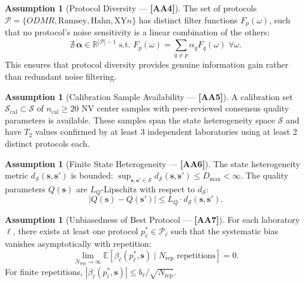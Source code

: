 \documentclass[11pt,a4paper]{article}
\theoremstyle{definition}
\newtheorem{assumption}[theorem]{Assumption}
\newcommand{\R}{\mathbb{R}}
\newcommand{\E}{\mathbb{E}}
\newcommand{\cP}{\mathcal{P}}
\newcommand{\cS}{\mathcal{S}}
\newcommand{\Ttwo}{T_2}
\newcommand{\NV}{NV}
\newcommand{\ODMR}{ODMR}
\newcommand{\assumptionTag}[1]{\textsf{\textbf{[A#1]}}}
\begin{document}
\begin{assumption}[Protocol Diversity — \assumptionTag{A4}]
\label{ass:A4}
The set of protocols $\cP = \{\ODMR, \text{Ramsey}, \text{Hahn}, \text{XY}n\}$
has distinct filter functions $F_p(\omega)$, such that no protocol's
noise sensitivity is a linear combination of the others:
\begin{equation}
    \nexists\, \boldsymbol{\alpha} \in \R^{|\cP|-1} \text{ s.t. } F_p(\omega) = \sum_{q \neq p} \alpha_q F_q(\omega) \; \forall \omega.
\end{equation}
This ensures that protocol diversity provides genuine information gain
rather than redundant noise filtering.
\end{assumption}

\begin{assumption}[Calibration Sample Availability — \assumptionTag{A5}]
\label{ass:A5}
A calibration set $\cS_{\text{cal}} \subset \cS$ of $n_{\text{cal}} \geq 20$
\NV{} center samples with peer-reviewed consensus quality parameters
is available. These samples span the state heterogeneity space
$\cS$ and have $\Ttwo$ values confirmed by at least 3 independent
laboratories using at least 2 distinct protocols each.
\end{assumption}

\begin{assumption}[Finite State Heterogeneity — \assumptionTag{A6}]
\label{ass:A6}
The state heterogeneity metric $d_{\cS}(\mathbf{s}, \mathbf{s}')$ is
bounded: $\sup_{\mathbf{s}, \mathbf{s}' \in \cS} d_{\cS}(\mathbf{s}, \mathbf{s}') \leq D_{\max} < \infty$.
The quality parameters $Q(\mathbf{s})$ are $L_Q$-Lipschitz with respect
to $d_{\cS}$:
\begin{equation}
    |Q(\mathbf{s}) - Q(\mathbf{s}')| \leq L_Q \cdot d_{\cS}(\mathbf{s}, \mathbf{s}').
\end{equation}
\end{assumption}

\begin{assumption}[Unbiasedness of Best Protocol — \assumptionTag{A7}]
\label{ass:A7}
For each laboratory $\ell$, there exists at least one protocol
$p^*_\ell \in \cP_\ell$ such that the systematic bias vanishes
asymptotically with repetition:
\begin{equation}
    \lim_{N_{\text{rep}} \to \infty} \E[\beta_\ell(p^*_\ell, \mathbf{s}) \mid N_{\text{rep}} \text{ repetitions}] = 0.
\end{equation}
For finite repetitions, $|\beta_\ell(p^*_\ell, \mathbf{s})| \leq b_\ell / \sqrt{N_{\text{rep}}}$.
\end{assumption}
\end{document}
